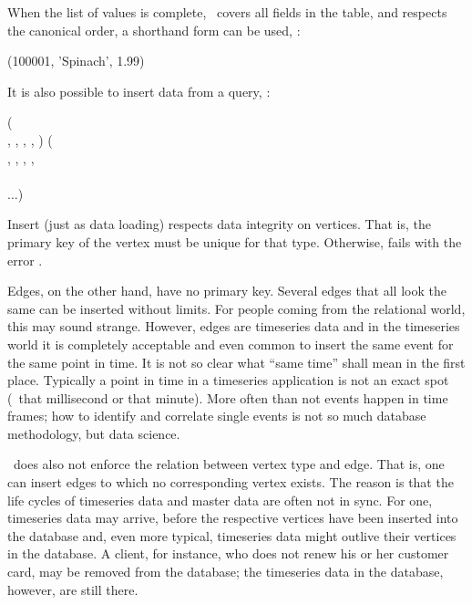When the list of values is complete,
\ie\ covers all fields in the table,
and respects the canonical order,
a shorthand form can be used, \eg:

  
      (100001, 'Spinach', 1.99)

It is also possible  to insert data from
a query, \eg:

\begin{minipage}{\textwidth}
  ( \\
                      ,
                      ,
                      ,
                      ,
                      ) (\\
\hspace*{0.2cm} , 
                         ,
                         ,
                         ,
                          \\
\hspace*{0.35cm}  \\
\hspace*{0.2cm} $\dots$)
\end{minipage}

Insert (just as data loading) respects data integrity
on vertices. That is, the primary key of the vertex
must be unique for that type. Otherwise, 
fails with the error .

Edges, on the other hand, have no primary key.
Several edges that all look the same can be inserted
without limits. For people coming from the relational
world, this may sound strange. However, edges are
timeseries data and in the timeseries world
it is completely acceptable and
even common to insert the same event for the same
point in time. It is not so clear 
what ``same time'' shall mean in the first place.
Typically a point in time in a timeseries application
is not an exact spot (\eg\ that millisecond or that
minute). More often than not events happen in
time frames; how to identify and correlate single events
is not so much database methodology, but data science.

\nowdb\ does also not enforce the relation between
vertex type and edge. That is, one can insert edges
to which no corresponding vertex exists.
The reason is that the life cycles of timeseries data
and master data are often not in sync.
For one, timeseries data may arrive, before the
respective vertices have been inserted into the database
and, even more typical, timeseries data might
outlive their vertices in the database.
A client, for instance, who does not renew his or her
customer card, may be removed from the database;
the timeseries data in the database, however,
are still there.

